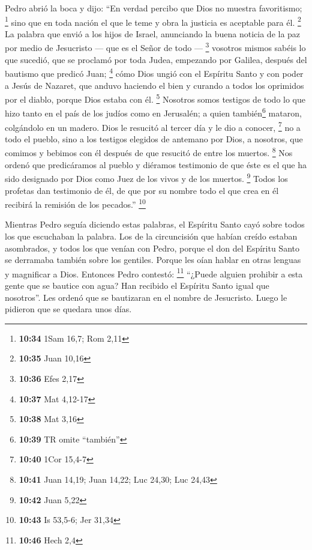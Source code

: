  Pedro abrió la boca y dijo: ``En verdad percibo que Dios
no muestra favoritismo; \footnote{\textbf{10:34} 1Sam 16,7; Rom 2,11}
 sino que en toda nación el que le teme y obra la
justicia es aceptable para él. \footnote{\textbf{10:35} Juan 10,16}
 La palabra que envió a los hijos de Israel, anunciando
la buena noticia de la paz por medio de Jesucristo --- que es el Señor
de todo --- \footnote{\textbf{10:36} Efes 2,17}  vosotros
mismos sabéis lo que sucedió, que se proclamó por toda Judea, empezando
por Galilea, después del bautismo que predicó Juan; \footnote{\textbf{10:37}
  Mat 4,12-17}  cómo Dios ungió con el Espíritu Santo y
con poder a Jesús de Nazaret, que anduvo haciendo el bien y curando a
todos los oprimidos por el diablo, porque Dios estaba con él.
\footnote{\textbf{10:38} Mat 3,16}  Nosotros somos
testigos de todo lo que hizo tanto en el país de los judíos como en
Jerusalén; a quien también\footnote{\textbf{10:39} TR omite ``también''}
mataron, colgándolo en un madero.  Dios le resucitó al
tercer día y le dio a conocer, \footnote{\textbf{10:40} 1Cor 15,4-7}
 no a todo el pueblo, sino a los testigos elegidos de
antemano por Dios, a nosotros, que comimos y bebimos con él después de
que resucitó de entre los muertos. \footnote{\textbf{10:41} Juan 14,19;
  Juan 14,22; Luc 24,30; Luc 24,43}  Nos ordenó que
predicáramos al pueblo y diéramos testimonio de que éste es el que ha
sido designado por Dios como Juez de los vivos y de los muertos.
\footnote{\textbf{10:42} Juan 5,22}  Todos los profetas
dan testimonio de él, de que por su nombre todo el que crea en él
recibirá la remisión de los pecados.'' \footnote{\textbf{10:43} Is
  53,5-6; Jer 31,34}

 Mientras Pedro seguía diciendo estas palabras, el
Espíritu Santo cayó sobre todos los que escuchaban la palabra.
 Los de la circuncisión que habían creído estaban
asombrados, y todos los que venían con Pedro, porque el don del Espíritu
Santo se derramaba también sobre los gentiles.  Porque
les oían hablar en otras lenguas y magnificar a Dios. Entonces Pedro
contestó: \footnote{\textbf{10:46} Hech 2,4}  ``¿Puede
alguien prohibir a esta gente que se bautice con agua? Han recibido el
Espíritu Santo igual que nosotros''.  Les ordenó que se
bautizaran en el nombre de Jesucristo. Luego le pidieron que se quedara
unos días.

